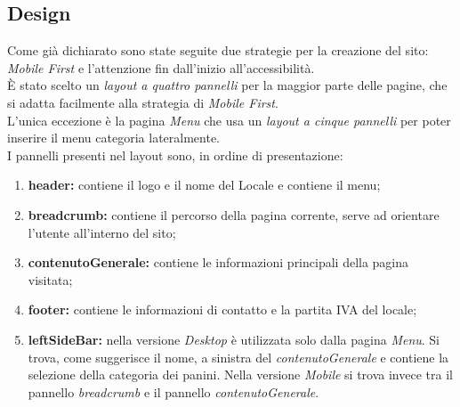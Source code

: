 \subsection{Design}
Come già dichiarato sono state seguite due strategie per la creazione del sito: \emph{Mobile First} e l'attenzione fin dall'inizio all'accessibilità.\\
È stato scelto un \emph{layout a quattro pannelli} per la maggior parte delle pagine, che si adatta facilmente alla strategia di \emph{Mobile First}.\\
L'unica eccezione è la pagina \emph{Menu} che usa un \emph{layout a cinque pannelli} per poter inserire il menu categoria lateralmente.\\
I pannelli presenti nel layout sono, in ordine di presentazione:
\begin{enumerate}
	\item \textbf{header:} contiene il logo e il nome del Locale e contiene il menu; 
	\item \textbf{breadcrumb:} contiene il percorso della pagina corrente, serve ad orientare l'utente all'interno del sito;
	\item \textbf{contenutoGenerale:} contiene le informazioni principali della pagina visitata;
	\item \textbf{footer:} contiene le informazioni di contatto e la partita IVA del locale;
	\item \textbf{leftSideBar:} nella versione \emph{Desktop} è utilizzata solo dalla pagina \emph{Menu}.
	 Si trova, come suggerisce il nome, a sinistra del \emph{contenutoGenerale} e contiene la selezione della categoria dei panini. 
	Nella versione \emph{Mobile} si trova invece tra il pannello \emph{breadcrumb} e il pannello \emph{contenutoGenerale}.
\end{enumerate}